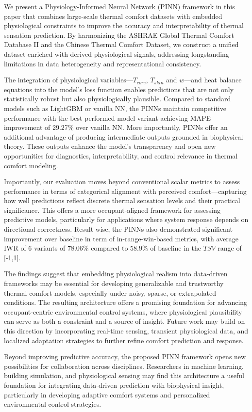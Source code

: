 We present a Physiology-Informed Neural Network (PINN) framework in this paper that combines large-scale thermal comfort datasets with embedded physiological constraints to improve the accuracy and interpretability of thermal sensation prediction. By harmonizing the ASHRAE Global Thermal Comfort Database II and the Chinese Thermal Comfort Dataset, we construct a unified dataset enriched with derived physiological signals, addressing longstanding limitations in data heterogeneity and representational consistency.

The integration of physiological variables—$T_{core}$, $T_{skin}$ and $w$—and heat balance equations into the model's loss function enables predictions that are not only statistically robust but also physiologically plausible. Compared to standard models such as LightGBM or vanilla NN, the PINNs maintain competitive performance with the best-performed model variant achieving MAPE improvement of 29.27\% over vanilla NN. More importantly, PINNs offer an additional advantage of producing intermediate outputs grounded in biophysical theory. These outputs enhance the model’s transparency and open new opportunities for diagnostics, interpretability, and control relevance in thermal comfort modeling.

Importantly, our evaluation moves beyond conventional scalar metrics to assess performance in terms of categorical alignment with perceived comfort—capturing how well predictions reflect discrete thermal sensation levels and their practical significance. This offers a more occupant-aligned framework for assessing predictive models, particularly for applications where system response depends on directional correctness. Result-wise, the PINNs also demonstrated significant improvement over baseline in term of in-range-win-based metrics, with average IWR of 6 variants of 78.06\% compared to 58.9\% of baseline in the $TSV$ range of [-1,1].

The findings suggest that embedding physiological realism into data-driven frameworks may be essential for developing generalizable and trustworthy thermal comfort models, especially under noisy, sparse, or extrapolated conditions. The resulting architecture offers a promising foundation for advancing occupant-centric environmental control systems, where physiological plausibility can serve as both a constraint and a source of insight. Future work may build on this direction by incorporating real-time sensing, transient physiological data, and localized adaptation strategies to further refine comfort prediction and response.

Beyond improving predictive accuracy, the proposed PINN framework opens new possibilities for collaboration across disciplines. Researchers in machine learning, building simulation, and physiological sensing may find this architecture a useful foundation for integrating data-driven prediction with biophysical insight, particularly in developing adaptive comfort systems and personalized environmental control strategies.